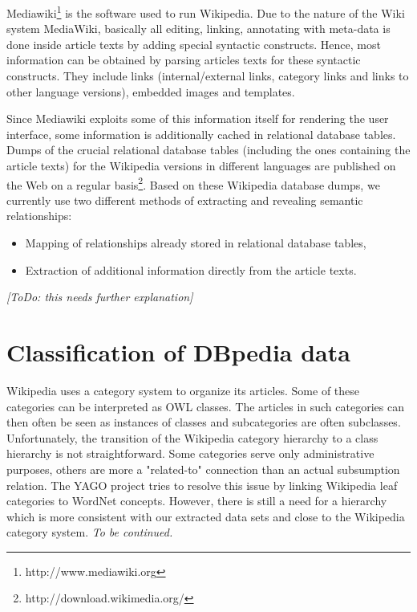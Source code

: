 \documentclass{llncs}
\newcommand{\todo}[1]{\emph{[ToDo: #1]}}
\begin{document}
Mediawiki\footnote{http://www.mediawiki.org} is the software used to run Wikipedia. Due to the nature of the Wiki system MediaWiki, basically all editing, linking, annotating with meta-data is done inside article texts by adding special syntactic constructs. Hence, most information can be obtained by parsing articles texts for these syntactic constructs. They include links (internal/external links, category links and links to other language versions), embedded images and templates.

Since Mediawiki exploits some of this information itself for rendering the user interface, some
information is additionally cached in relational database tables. Dumps of the crucial relational
database tables (including the ones containing the article texts) for the Wikipedia versions in
different languages are published on the Web on a regular
basis\footnote{http://download.wikimedia.org/}. Based on these Wikipedia database dumps, we
currently use two different methods of extracting and revealing semantic relationships:

\begin{itemize}
	\item Mapping of relationships already stored in relational database tables,
	\item Extraction of additional information directly from the article texts.
\end{itemize}

\todo{this needs further explanation}

\section{Classification of DBpedia data}

Wikipedia uses a category system to organize its articles. Some of these categories can be interpreted as OWL classes. The articles in such categories can then often be seen as instances of classes and subcategories are often subclasses. Unfortunately, the transition of the Wikipedia category hierarchy to a class hierarchy is not straightforward. Some categories serve only administrative purposes, others are more a "related-to" connection than an actual subsumption relation. The YAGO project \cite{suchanek2007WWW} tries to resolve this issue by linking Wikipedia leaf categories to WordNet concepts. However, there is still a need for a hierarchy which is more consistent with our extracted data sets and close to the Wikipedia category system. \emph{To be continued.}
\end{document}
